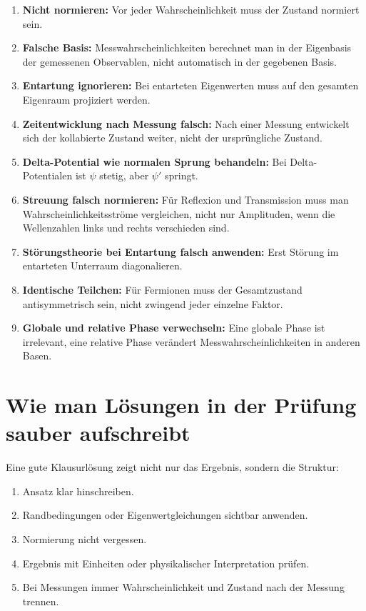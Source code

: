 \begin{examtipbox}
\begin{enumerate}
    \item \textbf{Nicht normieren:} Vor jeder Wahrscheinlichkeit muss der Zustand normiert sein.
    \item \textbf{Falsche Basis:} Messwahrscheinlichkeiten berechnet man in der Eigenbasis der gemessenen Observablen, nicht automatisch in der gegebenen Basis.
    \item \textbf{Entartung ignorieren:} Bei entarteten Eigenwerten muss auf den gesamten Eigenraum projiziert werden.
    \item \textbf{Zeitentwicklung nach Messung falsch:} Nach einer Messung entwickelt sich der kollabierte Zustand weiter, nicht der ursprüngliche Zustand.
    \item \textbf{Delta-Potential wie normalen Sprung behandeln:} Bei Delta-Potentialen ist $\psi$ stetig, aber $\psi'$ springt.
    \item \textbf{Streuung falsch normieren:} Für Reflexion und Transmission muss man Wahrscheinlichkeitsströme vergleichen, nicht nur Amplituden, wenn die Wellenzahlen links und rechts verschieden sind.
    \item \textbf{Störungstheorie bei Entartung falsch anwenden:} Erst Störung im entarteten Unterraum diagonalieren.
    \item \textbf{Identische Teilchen:} Für Fermionen muss der Gesamtzustand antisymmetrisch sein, nicht zwingend jeder einzelne Faktor.
    \item \textbf{Globale und relative Phase verwechseln:} Eine globale Phase ist irrelevant, eine relative Phase verändert Messwahrscheinlichkeiten in anderen Basen.
\end{enumerate}
\end{examtipbox}

\section{Wie man Lösungen in der Prüfung sauber aufschreibt}

\begin{examtipbox}
Eine gute Klausurlösung zeigt nicht nur das Ergebnis, sondern die Struktur:
\begin{enumerate}
    \item Ansatz klar hinschreiben.
    \item Randbedingungen oder Eigenwertgleichungen sichtbar anwenden.
    \item Normierung nicht vergessen.
    \item Ergebnis mit Einheiten oder physikalischer Interpretation prüfen.
    \item Bei Messungen immer Wahrscheinlichkeit und Zustand nach der Messung trennen.
\end{enumerate}
\end{examtipbox}

